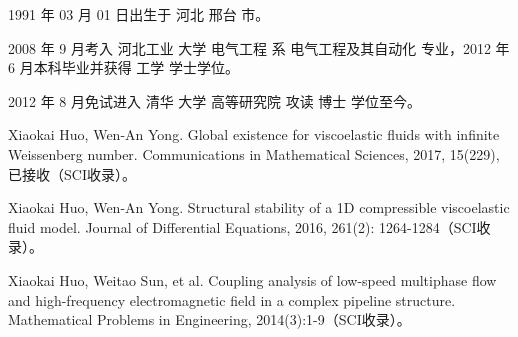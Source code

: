 \begin{resume}


  1991 年 03 月 01 日出生于 河北 邢台 市。

  2008 年 9 月考入 河北工业 大学  电气工程 系 电气工程及其自动化 专业，2012 年 6 月本科毕业并获得 工学 学士学位。

  2012 年 8 月免试进入 清华 大学 高等研究院 攻读 博士 学位至今。


  \begin{publications}
  \item Xiaokai Huo, Wen-An Yong. Global existence for viscoelastic fluids with infinite Weissenberg number. Communications in Mathematical Sciences, 2017, 15(229), 已接收（SCI收录）。
  \item Xiaokai Huo, Wen-An Yong. Structural stability of a 1D compressible viscoelastic fluid model. Journal of Differential Equations, 2016, 261(2): 1264-1284（SCI收录）。
  \item Xiaokai Huo, Weitao Sun, et al. Coupling analysis of low-speed multiphase flow and high-frequency electromagnetic field in a complex pipeline structure. Mathematical Problems in Engineering, 2014(3):1-9（SCI收录）。
  \end{publications}

\end{resume}
